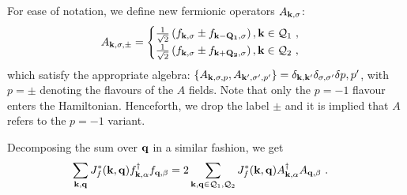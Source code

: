 For ease of notation, we define new fermionic operators \(A_{{\bf k},\sigma}\):
\begin{equation}\begin{aligned}\label{defineA}
	A_{{\bf k},\sigma,\pm} = \begin{cases}
		\frac{1}{\sqrt{2}}\left(f_{{\bf k},\sigma} \pm f_{{\bf k - Q_1},\sigma}\right), {\bf k}\in\mathcal{Q}_1~,\\
		\frac{1}{\sqrt{2}}\left(f_{{\bf k},\sigma} \pm f_{{\bf k + Q_2},\sigma}\right), {\bf k}\in\mathcal{Q}_2~,
	\end{cases}
\end{aligned}\end{equation}
which satisfy the appropriate algebra: \(\left\{A_{{\bf k},\sigma, p}, A_{{\bf k}^\prime,\sigma^\prime, p^\prime}\right\} = \delta_{{\bf k},{\bf k}^\prime}\delta_{\sigma,\sigma^\prime}\delta{p, p^\prime}\), with \(p=\pm\) denoting the flavours of the \(A\) fields. Note that only the \(p=-1\) flavour enters the Hamiltonian. Henceforth, we drop the label \(\pm\) and it is implied that \(A\) refers to the \(p=-1\) variant.

Decomposing the sum over \({\bf q}\) in a similar fashion, we get
\begin{equation}\begin{aligned}\label{kondoAB}
	\sum_{{\bf k}, {\bf q}} J_f^*({\bf k},{\bf q}) f^\dagger_{{\bf k},\alpha}f_{{\bf q},\beta} 
	&= 2\sum_{{\bf k}, {\bf q} \in \mathcal{Q}_1, \mathcal{Q}_2} J_f^*({\bf k},{\bf q}) A^\dagger_{{\bf k},\alpha}A_{{\bf q},\beta}~.
\end{aligned}\end{equation}

